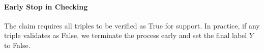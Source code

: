 \paragraph{Early Stop in Checking} 
The claim requires all triples to be verified as True for support. In practice, if any triple validates as False, we terminate the process early and set the final label $Y$ to False.







